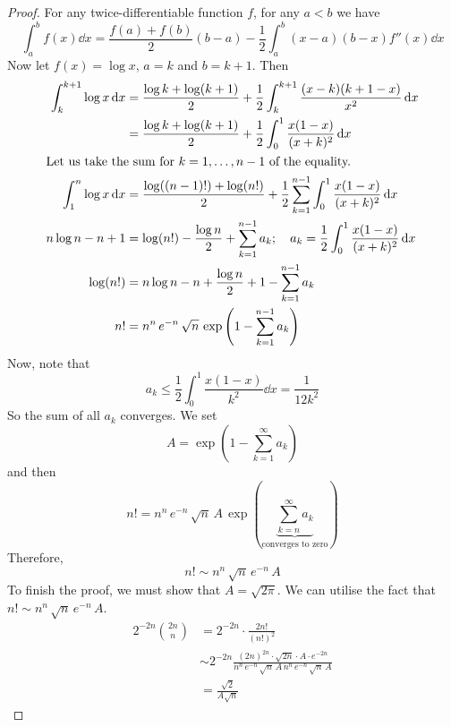\begin{proof}
	For any twice-differentiable function \(f\), for any \(a < b\) we have
	\[
		\int_a^b f(x) \dd{x} = \frac{f(a) + f(b)}{2} (b - a) - \frac{1}{2}\int_a^b (x-a)(b-x)f''(x)\dd{x}
	\]
	Now let \(f(x) = \log x\), \(a=k\) and \(b=k+1\).
	Then
	\begin{align*}
		\int_k^{k+1} \log x \dd{x} & = \frac{\log k + \log(k+1)}{2} + \frac{1}{2}\int_k^{k+1} \frac{(x-k)(k+1-x)}{x^2}\dd{x}                            \\
		                           & = \frac{\log k + \log(k+1)}{2} + \frac{1}{2}\int_0^1 \frac{x(1-x)}{(x+k)^2}\dd{x}                                  \\
		\intertext{Let us take the sum for \(k=1, \dots, n-1\) of the equality.}
		\int_1^n \log x \dd{x}     & = \frac{\log ((n-1)!) + \log(n!)}{2} + \frac{1}{2}\sum_{k=1}^{n-1}\int_0^1 \frac{x(1-x)}{(x+k)^2}\dd{x}            \\
		n\log n - n + 1            & = \log (n!) - \frac{\log n}{2} + \sum_{k=1}^{n-1} a_k;\quad a_k = \frac{1}{2}\int_0^1 \frac{x(1-x)}{(x+k)^2}\dd{x} \\
		\log (n!)                  & = n \log n - n + \frac{\log n}{2} + 1 - \sum_{k=1}^{n-1} a_k                                                       \\
		n!                         & = n^n \, e^{-n} \, \sqrt n \, \exp\left( 1 - \sum_{k=1}^{n-1} a_k \right)
	\end{align*}
	Now, note that
	\[
		a_k \leq \frac{1}{2}\int_0^1 \frac{x(1-x)}{k^2}\dd{x} = \frac{1}{12k^2}
	\]
	So the sum of all \(a_k\) converges.
	We set
	\[
		A = \exp\left( 1 - \sum_{k=1}^\infty a_k \right)
	\]
	and then
	\[
		n! = n^n \, e^{-n} \, \sqrt n \, A \, \exp\left( \underbrace{\sum_{k=n}^\infty a_k}_{\text{converges to zero}} \right)
	\]
	Therefore,
	\[
		n! \sim n^n\, \sqrt{n}\, e^{-n}\, A
	\]
	To finish the proof, we must show that \(A = \sqrt{2 \pi}\).
	We can utilise the fact that \(n! \sim n^n\, \sqrt{n}\, e^{-n}\, A\).
	\begin{align*}
		2^{-2n} \binom{2n}{n} & = 2^{-2n} \cdot \frac{2n!}{(n!)^2}                                                                                           \\
		                      & \sim 2^{-2n} \frac{(2n)^{2n} \cdot \sqrt{2n} \cdot A \cdot e^{-2n}}{n^n\, e^{-n}\, \sqrt n\, A\, n^n\, e^{-n}\, \sqrt n\, A} \\
		                      & = \frac{\sqrt{2}}{A\sqrt{n}}
	\end{align*}

\end{proof}
